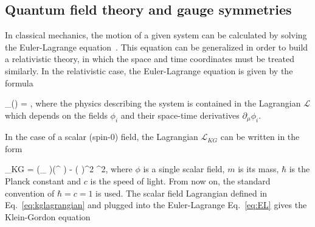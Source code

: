 


\subsection{Quantum field theory and gauge symmetries~\label{sec:QFT}}

In classical mechanics, the motion of a given system can be calculated by solving the Euler-Lagrange equation~\cite{9783527411887}. This equation can be generalized in order to build a relativistic theory, in which the space and time coordinates must be treated similarly. In the relativistic case, the Euler-Lagrange equation is given by the formula

{
 \partial_{\mu}\left (\right) = ,
}
where the physics describing the system is contained in the Lagrangian $\mathcal{L}$ which depends on the fields $\phi_{i}$ and their space-time derivatives $\partial_{\mu}\phi_{i}$. 

In the case of a scalar (spin-0) field, the Lagrangian $\mathcal{L}_{KG}$ can be written in the form 

{
 _{KG} = (\partial_{\mu} \phi)(\partial^{\mu} \phi) -  \left( \right)^{2} \phi^{2},
}
where $\phi$ is a single scalar field, $m$ is its mass, $\hbar$ is the Planck constant and $c$ is the speed of light. From now on, the standard convention of $\hbar = c = 1$ is used. The scalar field Lagrangian defined in Eq.~\ref{eq:kglagrangian} and plugged into the Euler-Lagrange Eq.~\ref{eq:EL} gives the Klein-Gordon equation


